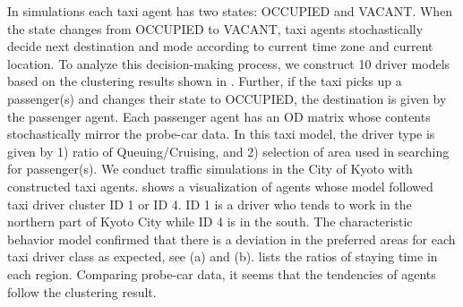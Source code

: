 In simulations each taxi agent has two states: OCCUPIED and VACANT. When the state changes from OCCUPIED to VACANT, taxi agents stochastically decide next destination and mode according to current time zone and current location. To analyze this decision-making process, we construct 10 driver models based on the clustering results shown in . Further, if the taxi picks up a passenger(s) and changes their state to OCCUPIED, the destination is given by the passenger agent. Each passenger agent has an OD matrix whose contents stochastically mirror the probe-car data. In this taxi model, the driver type is given by 1) ratio of Queuing/Cruising, and 2) selection of area used in searching for passenger(s).
We conduct traffic simulations in the City of Kyoto with constructed taxi agents.
 shows a visualization of agents whose model followed taxi driver cluster ID 1 or ID 4. ID 1 is a driver who tends to work in the northern part of Kyoto City while ID 4 is in the south. The characteristic behavior model confirmed that there is a deviation in the preferred areas for each taxi driver class as expected, see  (a) and (b).  lists the ratios of staying time in each region. Comparing probe-car data, it seems that the tendencies of agents follow the clustering result.
